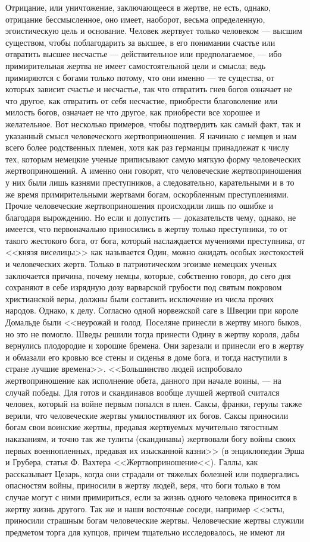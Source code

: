 \documentclass[12pt]{article}
\begin{document}
Отрицание, или уничтожение, заключающееся в жертве, не есть, однако, отрицание бессмысленное, оно имеет, наоборот, весьма определенную, эгоистическую цель и основание. Человек жертвует только человеком --- высшим существом, чтобы поблагодарить за высшее, в его понимании счастье или отвратить высшее несчастье --- действительное или предполагаемое, --- ибо примирительная жертва не имеет самостоятельной цели и смысла; ведь примиряются с богами только потому, что они именно --- те существа, от которых зависит счастье и несчастье, так что отвратить гнев богов означает не что другое, как отвратить от себя несчастие, приобрести благоволение или милость богов, означает не что другое, как приобрести все хорошее и желательное. Вот несколько примеров, чтобы подтвердить как самый факт, так и указанный смысл человеческого жертвоприношения. Я начинаю с немцев и нам всего более родственных племен, хотя как раз германцы принадлежат к числу тех, которым немецкие ученые приписывают самую мягкую форму человеческих жертвоприношений. А именно они говорят, что человеческие жертвоприношения у них были лишь казнями преступников, а следовательно, карательными и в то же время примирительными жертвами богам, оскорбленным преступлениями. Прочие человеческие жертвоприношения происходили лишь по ошибке и благодаря вырождению. Но если и допустить --- доказательств чему, однако, не имеется, что первоначально приносились в жертву только преступники, то от такого жестокого бога, от бога, который наслаждается мучениями преступника, от <<князя виселицы>>  как называется Один, можно ожидать особых жестокостей и человеческих жертв. Только в патриотическом эгоизме немецких ученых заключается причина, почему немцы, которые, собственно говоря, до сего дня сохраняют в себе изрядную дозу варварской грубости под святым покровом христианской веры, должны были составить исключение из числа прочих народов. Однако, к делу. Согласно одной норвежской саге в Швеции при короле Домальде были <<неурожай и голод. Поселяне принесли в жертву много быков, но это не помогло. Шведы решили тогда принести Одину в жертву короля, дабы вернулись плодородие и хорошие бремена. Они зарезали и принесли его в жертву и обмазали его кровью все стены и сиденья в доме бога, и тогда наступили в стране лучшие времена>>. <<Большинство людей испробовало жертвоприношение как исполнение обета, данного при начале воины, --- на случай победы. Для готов и скандинавов вообще лучшей жертвой считался человек, который на войне первым попался в плен. Саксы, франки, герулы также верили, что человеческие жертвы умилостивляют их богов. Саксы приносили богам свои воинские жертвы, предавая жертвуемых мучительно тягостным наказаниям, и точно так же тулиты (скандинавы) жертвовали богу войны своих первых военнопленных, предавая их изысканной казни>> (в энциклопедии Эрша и Грубера, статья Ф. Вахтера <<Жертвоприношение<<). Галлы, как рассказывает Цезарь, когда они страдали от тяжелых болезней или подвергались опасностям войны, приносили в жертву людей, веря, что боги только в том случае могут с ними примириться, если за жизнь одного человека приносится в жертву жизнь другого. Так же и наши восточные соседи, например <<эсты, приносили страшным богам человеческие жертвы. Человеческие жертвы служили предметом торга для купцов, причем тщательно исследовалось, не имеют ли 
\end{document}
